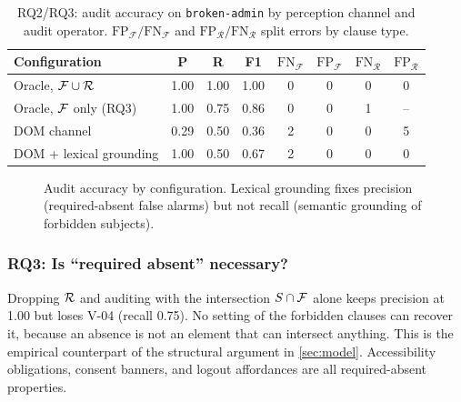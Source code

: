 \begin{table}[t]
\centering\small
\caption{RQ2/RQ3: audit accuracy on \texttt{broken-admin} by perception
channel and audit operator. $\text{FP}_\mathcal F/\text{FN}_\mathcal F$ and
$\text{FP}_\mathcal R/\text{FN}_\mathcal R$ split errors by clause type.}
\label{tab:rq2}
\setlength{\tabcolsep}{2.4pt}\footnotesize
\begin{tabular}{@{}lccccccc@{}}
\toprule
Configuration & P & R & F1 & $\text{FN}_\mathcal F$ & $\text{FP}_\mathcal F$ & $\text{FN}_\mathcal R$ & $\text{FP}_\mathcal R$\\
\midrule
Oracle, $\mathcal{F}\cup\mathcal{R}$ & 1.00 & 1.00 & 1.00 & 0 & 0 & 0 & 0 \\
Oracle, $\mathcal{F}$ only (RQ3) & 1.00 & 0.75 & 0.86 & 0 & 0 & 1 & -- \\
DOM channel & 0.29 & 0.50 & 0.36 & 2 & 0 & 0 & 5 \\
DOM + lexical grounding & 1.00 & 0.50 & 0.67 & 2 & 0 & 0 & 0 \\
\bottomrule
\end{tabular}
\end{table}

\begin{figure}[t]
\centering
{}
\caption{Audit accuracy by configuration. Lexical grounding fixes precision
(required-absent false alarms) but not recall (semantic grounding of
forbidden subjects).}
\label{fig:rq2}
\end{figure}

\subsubsection{RQ3: Is ``required absent'' necessary?}
\label{sec:eval:rq3}
Dropping $\mathcal{R}$ and auditing with the intersection $S\cap\mathcal{F}$ alone keeps
precision at 1.00 but loses V-04 (recall 0.75). No setting of the forbidden
clauses can recover it, because an absence is not an element that can
intersect anything. This is the empirical counterpart of the structural
argument in \cref{sec:model}. Accessibility obligations, consent banners, and
logout affordances are all required-absent properties.

